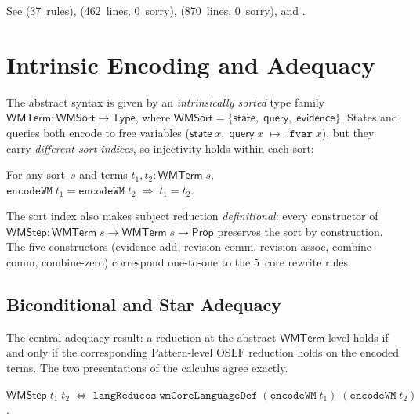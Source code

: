 \documentclass[11pt,openany]{report}
\begin{document}
\noindent
See 
(37~rules),
(462~lines, 0~sorry),
(870~lines, 0~sorry),
and .

\section{Intrinsic Encoding and Adequacy}
\label{sec:wm-encoding}

The abstract syntax is given by an \emph{intrinsically sorted} type family
$\mathsf{WMTerm} : \mathsf{WMSort} \to \mathsf{Type}$, where
$\mathsf{WMSort} = \{\mathsf{state},\; \mathsf{query},\;
\mathsf{evidence}\}$.
States and queries both encode to free variables
($\mathsf{state}\;x,\;\mathsf{query}\;x \;\mapsto\; \mathtt{.fvar}\;x$),
but they carry \emph{different sort indices}, so injectivity holds
within each sort:

\begin{theorem}
\label{thm:encode-injective}
For any sort~$s$ and terms $t_1, t_2 : \mathsf{WMTerm}\;s$,\;
$\mathtt{encodeWM}\;t_1 = \mathtt{encodeWM}\;t_2
\;\Rightarrow\; t_1 = t_2$.
\end{theorem}

\noindent
The sort index also makes subject reduction \emph{definitional}: every
constructor of $\mathsf{WMStep} : \mathsf{WMTerm}\;s \to
\mathsf{WMTerm}\;s \to \mathsf{Prop}$ preserves the sort by
construction.  The five constructors (evidence-add, revision-comm,
revision-assoc, combine-comm, combine-zero) correspond one-to-one to
the 5~core rewrite rules.

\subsection{Biconditional and Star Adequacy}
\label{sec:wm-star-adequacy}

The central adequacy result: a reduction at the abstract $\mathsf{WMTerm}$
level holds if and only if the corresponding Pattern-level OSLF reduction
holds on the encoded terms.  The two presentations of the calculus agree
exactly.

\begin{theorem}
\label{thm:wmstep-iff}
$\mathsf{WMStep}\;t_1\;t_2 \;\Leftrightarrow\;
\mathtt{langReduces}\;\mathtt{wmCoreLanguageDef}\;
(\mathtt{encodeWM}\;t_1)\;(\mathtt{encodeWM}\;t_2)$.
\end{theorem}
\end{document}
